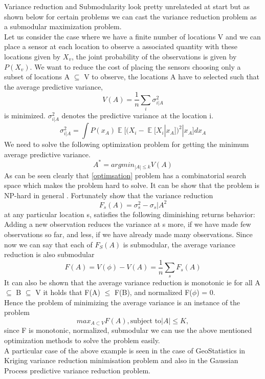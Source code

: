 \documentclass[a4paper,twoside]{iiththesis}
\theoremstyle{definition}
\theoremstyle{definition}
\theoremstyle{remark}
\DeclareMathOperator*{\E}{\mathop{\mathbb{E}}}
\begin{document}
Variance reduction and Submodularity look pretty unrelateded at start but as shown below for certain problems we can cast the variance reduction problem as a submodular maximization problem.
\\
Let us consider the case where we have a finite number of locations V and we can place a sensor at each location to observe a associated quantity with these locations given by $X_v$, the joint probability of the observations is given by $P(X_v)$. We want to reduce the cost of placing the sensors choosing only a subset of locations A $\subseteq$ V to observe, the locations A have to selected such that the average predictive variance, 
\begin{equation}
	V(A) = \frac{1}{n} \sum_{i} \sigma_{i|A}^2
\end{equation}
is minimized. $\sigma_{i|A}^2$ denotes the predictive variance at the location i. 
\begin{equation}
\sigma_{i|A}^2 = \int P(x_A) \E\Bigg[ (X_i -\E[ X_i | x_A])^2 | x_A\Bigg] dx_A
\end{equation}
We need to solve the following optimization problem for getting the minimum average predictive variance.
\begin{equation}\label{optimsation}
A^* = argmin_{|A| \leq k} V(A)
\end{equation}
As can be seen clearly that \ref{optimsation} problem has a combinatorial search space which makes the problem hard to solve. It can be show that the problem is NP-hard in general \cite{das2008algorithms}. Fortunately \cite{das2008algorithms} show that the variance reduction 
\begin{equation}
F_s(A) = \sigma_s^2 - \sigma_s|A ^2
\end{equation}
at any particular location s, satisfies the following diminishing returns behavior: Adding a new observation reduces the variance at s more, if we have made few observations so far, and less, if we have already made many observations. Since now we can say that each of $F_S(A)$ is submodular, the average variance reduction is also submodular 
\begin{equation}
	F(A) = V(\phi) - V(A) = \frac{1}{n} \sum_{s} F_s(A)
\end{equation}
It can also be shown that the average variance reduction is monotonic ie for all A $\subseteq$ B $\subseteq$ V it
holds that F(A) $\leq$ F(B), and normalized F($\phi$) = 0. \\
Hence the problem of minimizing the average variance is an instance of the problem 
\begin{equation}
max_{A\subset V}F(A) , \text{subject to} |A| \leq K, 
\end{equation}
since F is monotonic, normalized, submodular we can use the above mentioned optimization methods to solve the problem easily. \\
A particular case of the above example is seen in the case of GeoStatistics in Kriging variance reduction minimisation problem and also in the Gaussian Process predictive variance reduction problem. \\
\end{document}
